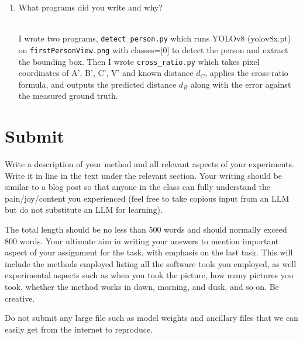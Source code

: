 \begin{enumerate}
\begin{studentSpace}
\end{studentSpace}


\item What programs did you write and why?  
\begin{studentSpace}
    \\I wrote two programs, \texttt{detect\_person.py} which runs YOLOv8 (yolov8x.pt) on \texttt{firstPersonView.png} with classes=[0] to detect the person and extract the bounding box. Then I wrote \texttt{cross\_ratio.py} which takes pixel coordinates of A', B', C', V' and known distance $d_C$, applies the cross-ratio formula, and outputs the predicted distance $d_B$ along with the error against the measured ground truth.
\end{studentSpace}


\end{enumerate}

\section{Submit}

Write a description of your method and all relevant aspects of your
experiments. Write it in line in the text under the relevant section.  Your writing should be similar to  a blog post so that anyone in the class can fully understand the pain/joy/content you experienced (feel free to take copious input from an LLM but do not substitute an LLM for learning).

The total length should be no less than 500 words and
should normally exceed 800 words.  Your ultimate aim in writing your answers
to mention important aspect of your assignment for the task, with
emphasis on the last task.  This will include the methods employed
listing all the software tools you employed, as well experimental
aspects such as when you took the picture, how many pictures 
you took, whether the method works in dawn, morning, and dusk, and so
on. Be creative.  

Do not submit any large file such as
model weights and ancillary files that we can easily get from the
internet to reproduce.
